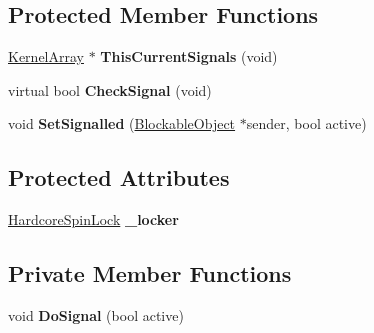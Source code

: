 \subsection*{Protected Member Functions}
\begin{DoxyCompactItemize}
\item 
\mbox{\label{class_blockable_object_a6326633563601e0b22ef3d38c09c72fb}} 
\hyperlink{class_kernel_array}{Kernel\+Array} $\ast$ {\bfseries This\+Current\+Signals} (void)
\item 
\mbox{\label{class_blockable_object_a9b76187d71a80f78bad22e801fdd6317}} 
virtual bool {\bfseries Check\+Signal} (void)
\item 
\mbox{\label{class_blockable_object_a32fa6d1b6011a0b8bb9b651455b17df0}} 
void {\bfseries Set\+Signalled} (\hyperlink{class_blockable_object}{Blockable\+Object} $\ast$sender, bool active)
\end{DoxyCompactItemize}
\subsection*{Protected Attributes}
\begin{DoxyCompactItemize}
\item 
\mbox{\label{class_blockable_object_a7a24c8b30ed53a5e34a81381cc9c98c0}} 
\hyperlink{class_hardcore_spin_lock}{Hardcore\+Spin\+Lock} {\bfseries \+\_\+locker}
\end{DoxyCompactItemize}
\subsection*{Private Member Functions}
\begin{DoxyCompactItemize}
\item 
\mbox{\label{class_blockable_object_ac05ea6392432f4d6bbae05fffb01f12a}} 
void {\bfseries Do\+Signal} (bool active)
\end{DoxyCompactItemize}
